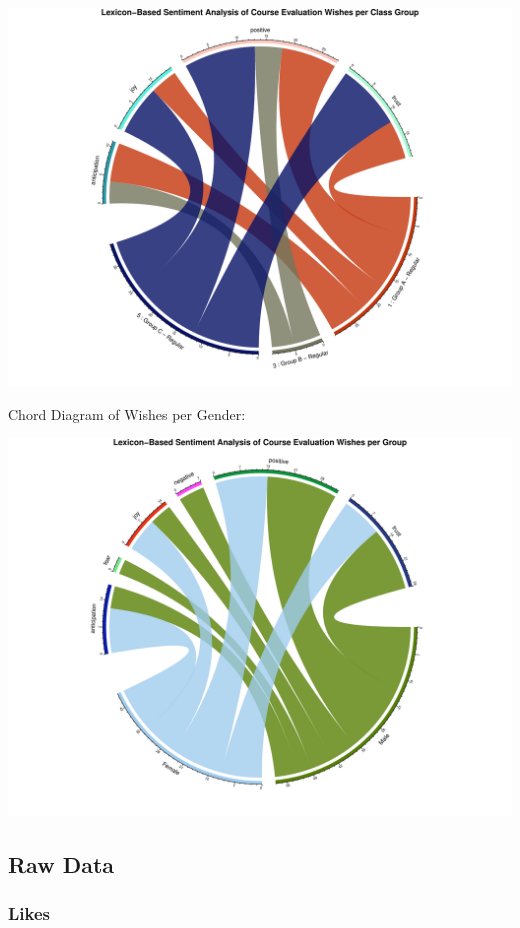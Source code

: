 \documentclass[
]{article}
\begin{document}
\includegraphics{AnalysisOfCourseEvaluation-Notebook_files/figure-latex/ChordDiagramPerGroup_Wishes-1.pdf}

\newpage

Chord Diagram of Wishes per Gender:

\includegraphics{AnalysisOfCourseEvaluation-Notebook_files/figure-latex/ChordDiagramPerGender_Wishes-1.pdf}

\newpage

\subsection{Raw Data}\label{raw-data}

\subsubsection{Likes}\label{likes}
\end{document}
